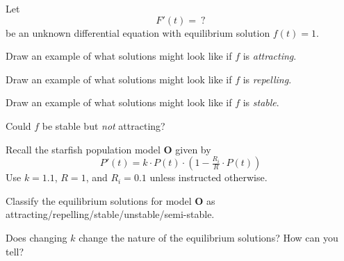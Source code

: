 \documentclass{workbook}
\begin{document}
\begin{slide}
	\question


	Let
	\[
		F'(t) =\ ?
	\]
	be an unknown differential equation with equilibrium solution $f(t)=1$.

	\begin{parts}
		\item Draw an example of what solutions might look like if $f$ is \emph{attracting}.
		\item Draw an example of what solutions might look like if $f$ is \emph{repelling}.
		\item Draw an example of what solutions might look like if $f$ is \emph{stable}.
		\item Could $f$ be stable but \emph{not} attracting?
	\end{parts}
\end{slide}

\begin{slide}
	\question
	
	
	Recall the starfish population model \textbf{O} given by
	\[
		P'(t) = k\cdot P(t)\cdot \left(1-\tfrac{R_i}{R}\cdot P(t)\right)
	\]
	Use $k=1.1$, $R=1$, and $R_i=0.1$ unless instructed otherwise.


	\begin{parts}
		\item Classify the equilibrium solutions for model \textbf{O} as attracting/repelling/stable/unstable/semi-stable.
		\item Does changing $k$ change the nature of the equilibrium solutions? How can you tell?
	\end{parts}
\end{slide}

%
%
\end{document}
